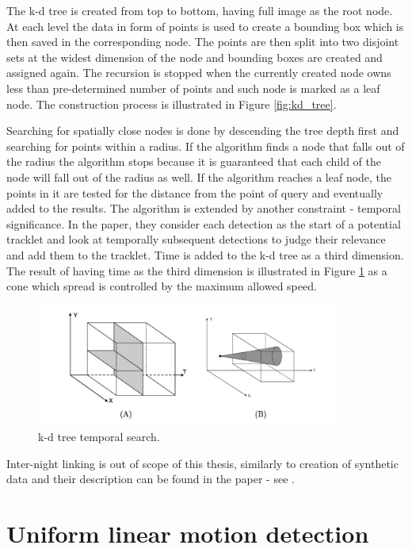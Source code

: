 	The k-d tree is created from top to bottom, having full image as the root node. At each level the data in form of points is used to create a bounding box which is then saved in the corresponding node. The points are then split into two disjoint sets at the widest dimension of the node and bounding boxes are created and assigned again. The recursion is stopped when the currently created node owns less than pre-determined number of points and such node is marked as a leaf node. The construction process is illustrated in Figure \ref{fig:kd_tree}.
	
	Searching for spatially close nodes is done by descending the tree depth first and searching for points within a radius. If the algorithm finds a node that falls out of the radius the algorithm stops because it is guaranteed that each child of the node will fall out of the radius as well. If the algorithm reaches a leaf node, the points in it are tested for the distance from the point of query and eventually added to the results. The algorithm is extended by another constraint - temporal significance. In the paper, they consider each detection as the start of a potential tracklet and look at temporally subsequent detections to judge their relevance and add them to the tracklet. Time is added to the k-d tree as a third dimension. The result of having time as the third dimension is illustrated in Figure \ref{fig:kd_tree_time} as a cone which spread is controlled by the maximum allowed speed.
	
	\begin{figure}[H]
	\centering
	  \includegraphics[width=10cm]{images/kd_tree_time}
		  \caption{k-d tree temporal search.}
	  \label{fig:kd_tree_time}
	\end{figure}
	
	Inter-night linking is out of scope of this thesis, similarly to creation of synthetic data and their description can be found in the paper - see \citep{}.

\section{Uniform linear motion detection}\label{sec:linear_motion}
	
